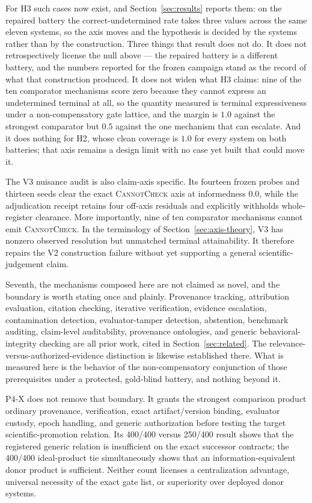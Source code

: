 For H3 such cases now exist, and Section~\ref{sec:results} reports them: on the repaired battery
the correct-undetermined rate takes three values across the same eleven systems, so the axis moves
and the hypothesis is decided by the systems rather than by the construction. Three things that
result does not do. It does not retrospectively license the null above --- the repaired battery is a
different battery, and the numbers reported for the frozen campaign stand as the record of what
that construction produced. It does not widen what H3 claims: nine of the ten comparator mechanisms
score zero because they cannot express an undetermined terminal at all, so the quantity measured is
terminal expressiveness under a non-compensatory gate lattice, and the margin is $1.0$ against the
strongest comparator but $0.5$ against the one mechanism that can escalate. And it does nothing for
H2, whose clean coverage is $1.0$ for every system on both batteries; that axis remains a design
limit with no case yet built that could move it.

The V3 nuisance audit is also claim-axis specific.  Its fourteen frozen probes
and thirteen seeds clear the exact \textsc{CannotCheck} axis at informedness
$0.0$, while the adjudication receipt retains four off-axis residuals and
explicitly withholds whole-register clearance.  More importantly, nine of ten
comparator mechanisms cannot emit \textsc{CannotCheck}.  In the terminology of
Section~\ref{sec:axis-theory}, V3 has nonzero observed resolution but unmatched
terminal attainability.  It therefore repairs the V2 construction failure
without yet supporting a general scientific-judgement claim.

Seventh, the mechanisms composed here are not claimed as novel, and the boundary is worth stating once and plainly. Provenance tracking, attribution evaluation, citation checking, iterative verification, evidence escalation, contamination detection, evaluator-tamper detection, abstention, benchmark auditing, claim-level auditability, provenance ontologies, and generic behavioral-integrity checking are all prior work, cited in Section~\ref{sec:related}. The relevance-versus-authorized-evidence distinction is likewise established there. What is measured here is the behavior of the non-compensatory conjunction of those prerequisites under a protected, gold-blind battery, and nothing beyond it.

P4-X does not remove that boundary.  It grants the strongest comparison product
ordinary provenance, verification, exact artifact/version binding, evaluator
custody, epoch handling, and generic authorization before testing the target
scientific-promotion relation.  Its 400/400 versus 250/400 result shows that the
registered generic relation is insufficient on the exact successor contracts;
the 400/400 ideal-product tie simultaneously shows that an information-equivalent
donor product is sufficient.  Neither count licenses a centralization advantage,
universal necessity of the exact gate list, or superiority over deployed donor
systems.

